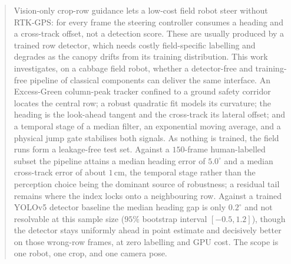 
\vspace{2em}

\begin{abstract}
    \noindent Vision-only crop-row guidance lets a low-cost field robot steer without RTK-GPS: for every
    frame the steering controller consumes a heading and a cross-track offset, not a detection score. These
    are usually produced by a trained row detector, which needs costly field-specific labelling and degrades
    as the canopy drifts from its training distribution. This work investigates, on a cabbage field robot,
    whether a detector-free and training-free pipeline of classical components can deliver the same
    interface. An Excess-Green column-peak tracker confined to a ground safety corridor locates the central
    row; a robust quadratic fit models its curvature; the heading is the look-ahead tangent and the
    cross-track its lateral offset; and a temporal stage of a median filter, an exponential moving average,
    and a physical jump gate stabilises both signals. As nothing is trained, the field runs form a
    leakage-free test set. Against a $150$-frame human-labelled subset the pipeline attains a median
    heading error of $5.0^{\circ}$ and a median cross-track error of about $1$\,cm, the temporal stage rather
    than the perception choice being the dominant source of robustness; a residual tail remains where the
    index locks onto a neighbouring row. Against a trained YOLOv5 detector baseline the median heading gap is
    only $0.2^{\circ}$ and not resolvable at this sample size ($95\%$ bootstrap interval $[-0.5,1.2]$), though
    the detector stays uniformly ahead in point estimate and decisively better on those wrong-row frames, at
    zero labelling and GPU cost. The scope is one robot, one crop, and one camera pose.
\end{abstract}

\vspace{1em}
\noindent {}
\vspace{1em}
